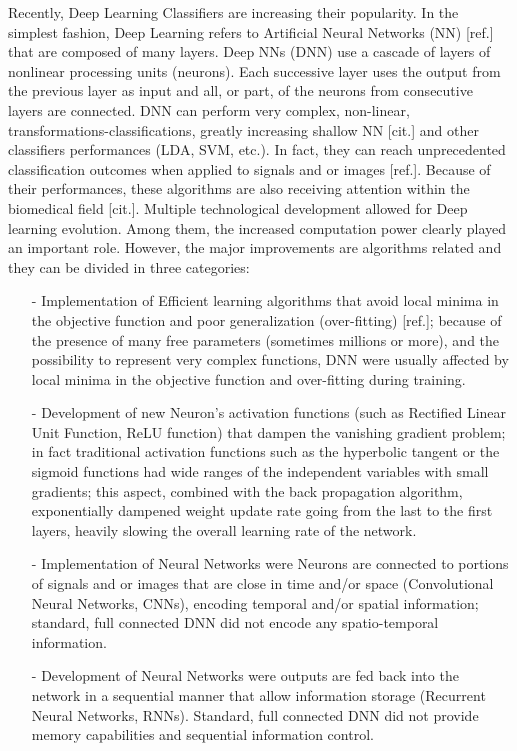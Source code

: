 \documentclass[12pt ]{iopart}
\begin{document}
Recently, Deep Learning Classifiers are increasing their popularity. In the simplest fashion, Deep Learning  refers to Artificial Neural Networks (NN) [ref.] that are composed of many layers. Deep NNs (DNN) use a cascade of  layers of nonlinear processing units (neurons). Each successive layer uses the output from the previous layer as input and all, or part, of the neurons from consecutive layers are connected. DNN can perform very complex, non-linear, transformations-classifications, greatly increasing shallow NN  [cit.]  and other classifiers performances (LDA, SVM, etc.). In fact, they can reach unprecedented classification outcomes when applied to signals and or images [ref.]. Because of their performances, these algorithms are also receiving  attention within the biomedical field [cit.]. 
Multiple technological development allowed for Deep learning evolution. 
Among them, the increased computation power clearly played an important role.
However, the major improvements are algorithms related and they can be divided in three  categories:

\begin{itemize}
	\item[-] Implementation of Efficient learning algorithms that avoid local minima in the objective function and poor generalization (over-fitting) [ref.]; because of the presence of many free parameters (sometimes millions or more), and the possibility to represent very complex functions, DNN were usually affected by local minima in the objective function and over-fitting  during training. 
	\item[-] Development of new Neuron's activation functions (such as Rectified Linear Unit Function, ReLU function) that dampen  the vanishing gradient problem; in fact traditional activation functions such as the hyperbolic tangent or the sigmoid functions had wide ranges of the independent variables with small gradients;  this aspect, combined with the back propagation algorithm, exponentially dampened weight update rate going from the last to the first layers, heavily slowing the overall learning rate of the network.
	\item[-] Implementation of  Neural Networks were Neurons are connected to portions of signals and or images that are close in time and/or space (Convolutional Neural Networks, CNNs), encoding temporal and/or spatial information; standard, full connected DNN  did not encode any spatio-temporal information.
	\item[-] Development of  Neural Networks were outputs are fed back into the network in a sequential manner that allow information storage (Recurrent Neural Networks, RNNs). Standard, full connected DNN  did not provide memory capabilities and sequential information control.
\end{itemize}
\end{document}
